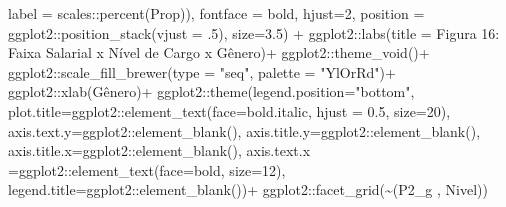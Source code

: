 \documentclass[
]{article}
\newenvironment{Shaded}{\begin{snugshade}}{\end{snugshade}}
\newcommand{\AttributeTok}[1]{\textcolor[rgb]{0.77,0.63,0.00}{#1}}
\newcommand{\DecValTok}[1]{\textcolor[rgb]{0.00,0.00,0.81}{#1}}
\newcommand{\FloatTok}[1]{\textcolor[rgb]{0.00,0.00,0.81}{#1}}
\newcommand{\FunctionTok}[1]{\textcolor[rgb]{0.00,0.00,0.00}{#1}}
\newcommand{\NormalTok}[1]{#1}
\newcommand{\SpecialCharTok}[1]{\textcolor[rgb]{0.00,0.00,0.00}{#1}}
\newcommand{\StringTok}[1]{\textcolor[rgb]{0.31,0.60,0.02}{#1}}
\begin{document}
\begin{Shaded}
\begin{Highlighting}[]
    \AttributeTok{label =}\NormalTok{ scales}\SpecialCharTok{::}\FunctionTok{percent}\NormalTok{(Prop)),}
    \AttributeTok{fontface =} \StringTok{\textquotesingle{}bold\textquotesingle{}}\NormalTok{,}
    \AttributeTok{hjust=}\DecValTok{2}\NormalTok{,}
    \AttributeTok{position =}\NormalTok{ ggplot2}\SpecialCharTok{::}\FunctionTok{position\_stack}\NormalTok{(}\AttributeTok{vjust =}\NormalTok{ .}\DecValTok{5}\NormalTok{),}
    \AttributeTok{size=}\FloatTok{3.5}\NormalTok{) }\SpecialCharTok{+}
\NormalTok{  ggplot2}\SpecialCharTok{::}\FunctionTok{labs}\NormalTok{(}\AttributeTok{title =} \StringTok{\textquotesingle{}Figura 16: Faixa Salarial x Nível de Cargo x Gênero\textquotesingle{}}\NormalTok{)}\SpecialCharTok{+}
\NormalTok{  ggplot2}\SpecialCharTok{::}\FunctionTok{theme\_void}\NormalTok{()}\SpecialCharTok{+}
\NormalTok{  ggplot2}\SpecialCharTok{::}\FunctionTok{scale\_fill\_brewer}\NormalTok{(}\AttributeTok{type =} \StringTok{"seq"}\NormalTok{, }\AttributeTok{palette =} \StringTok{"YlOrRd"}\NormalTok{)}\SpecialCharTok{+}
\NormalTok{  ggplot2}\SpecialCharTok{::}\FunctionTok{xlab}\NormalTok{(}\StringTok{\textquotesingle{}Gênero\textquotesingle{}}\NormalTok{)}\SpecialCharTok{+}
\NormalTok{  ggplot2}\SpecialCharTok{::}\FunctionTok{theme}\NormalTok{(}\AttributeTok{legend.position=}\StringTok{"bottom"}\NormalTok{,}
                 \AttributeTok{plot.title=}\NormalTok{ggplot2}\SpecialCharTok{::}\FunctionTok{element\_text}\NormalTok{(}\AttributeTok{face=}\StringTok{\textquotesingle{}bold.italic\textquotesingle{}}\NormalTok{,}
                                                  \AttributeTok{hjust =} \FloatTok{0.5}\NormalTok{, }\AttributeTok{size=}\DecValTok{20}\NormalTok{),}
                 \AttributeTok{axis.text.y=}\NormalTok{ggplot2}\SpecialCharTok{::}\FunctionTok{element\_blank}\NormalTok{(),}
                 \AttributeTok{axis.title.y=}\NormalTok{ggplot2}\SpecialCharTok{::}\FunctionTok{element\_blank}\NormalTok{(),}
                 \AttributeTok{axis.title.x=}\NormalTok{ggplot2}\SpecialCharTok{::}\FunctionTok{element\_blank}\NormalTok{(),}
                 \AttributeTok{axis.text.x =}\NormalTok{ggplot2}\SpecialCharTok{::}\FunctionTok{element\_text}\NormalTok{(}\AttributeTok{face=}\StringTok{\textquotesingle{}bold\textquotesingle{}}\NormalTok{, }\AttributeTok{size=}\DecValTok{12}\NormalTok{),}
                 \AttributeTok{legend.title=}\NormalTok{ggplot2}\SpecialCharTok{::}\FunctionTok{element\_blank}\NormalTok{())}\SpecialCharTok{+}
\NormalTok{  ggplot2}\SpecialCharTok{::}\FunctionTok{facet\_grid}\NormalTok{(}\SpecialCharTok{\textasciitilde{}}\StringTok{\textasciigrave{}}\AttributeTok{(\textquotesingle{}P2\_g \textquotesingle{}, \textquotesingle{}Nivel\textquotesingle{})}\StringTok{\textasciigrave{}}\NormalTok{)}
\end{Highlighting}
\end{Shaded}
\end{document}
